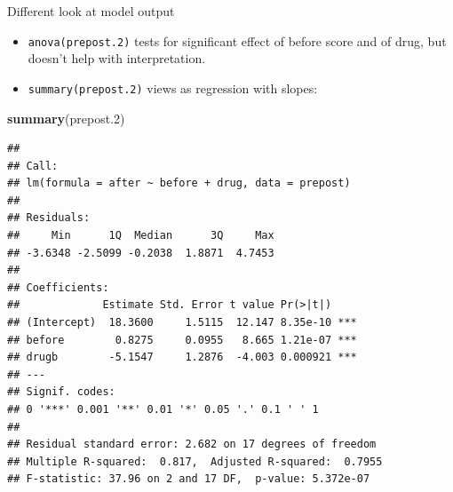 \documentclass[ignorenonframetext,]{beamer}
\newenvironment{Shaded}{\begin{snugshade}}{\end{snugshade}}
\newcommand{\FloatTok}[1]{\textcolor[rgb]{0.00,0.00,0.81}{#1}}
\newcommand{\KeywordTok}[1]{\textcolor[rgb]{0.13,0.29,0.53}{\textbf{#1}}}
\newcommand{\NormalTok}[1]{#1}
\begin{document}
\begin{frame}[fragile]{Different look at model output}
\protect\hypertarget{different-look-at-model-output}{}

\begin{itemize}
\item
  \texttt{anova(prepost.2)} tests for significant effect of before score
  and of drug, but doesn't help with interpretation.
\item
  \texttt{summary(prepost.2)} views as regression with slopes:
\end{itemize}

\scriptsize

\begin{Shaded}
\begin{Highlighting}[]
\KeywordTok{summary}\NormalTok{(prepost}\FloatTok{.2}\NormalTok{)}
\end{Highlighting}
\end{Shaded}

\begin{verbatim}
## 
## Call:
## lm(formula = after ~ before + drug, data = prepost)
## 
## Residuals:
##     Min      1Q  Median      3Q     Max 
## -3.6348 -2.5099 -0.2038  1.8871  4.7453 
## 
## Coefficients:
##             Estimate Std. Error t value Pr(>|t|)    
## (Intercept)  18.3600     1.5115  12.147 8.35e-10 ***
## before        0.8275     0.0955   8.665 1.21e-07 ***
## drugb        -5.1547     1.2876  -4.003 0.000921 ***
## ---
## Signif. codes:  
## 0 '***' 0.001 '**' 0.01 '*' 0.05 '.' 0.1 ' ' 1
## 
## Residual standard error: 2.682 on 17 degrees of freedom
## Multiple R-squared:  0.817,  Adjusted R-squared:  0.7955 
## F-statistic: 37.96 on 2 and 17 DF,  p-value: 5.372e-07
\end{verbatim}

\normalsize

\end{frame}
\end{document}
